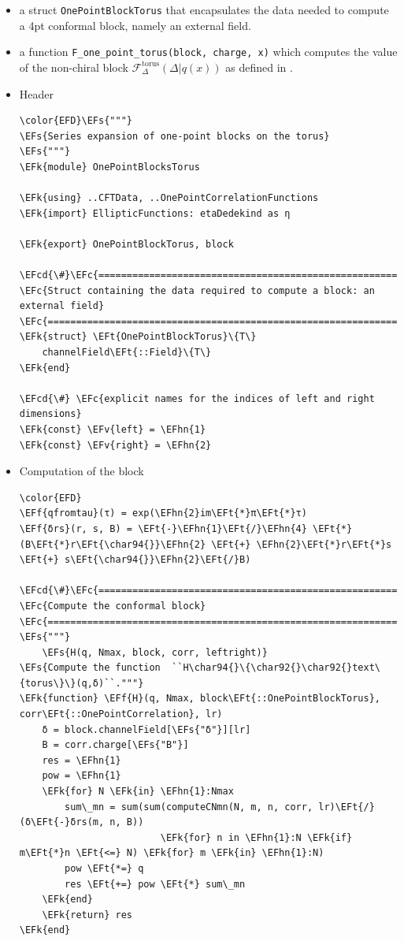 \documentclass[a4paper]{article}
\numberwithin{equation}{section}
\newcommand{\EFc}[1]{\textcolor{EFc}{#1}} %
\newcommand{\EFcd}[1]{\textcolor{EFcd}{#1}} %
\newcommand{\EFs}[1]{\textcolor{EFs}{#1}} %
\newcommand{\EFk}[1]{\textcolor{EFk}{#1}} %
\newcommand{\EFf}[1]{\textcolor{EFf}{#1}} %
\newcommand{\EFv}[1]{\textcolor{EFv}{#1}} %
\newcommand{\EFt}[1]{\textcolor{EFt}{#1}} %
\newcommand{\EFhn}[1]{\textcolor{EFhn}{#1}} %
\begin{document}
\begin{itemize}
\item a struct \texttt{OnePointBlockTorus} that encapsulates the data needed to compute a 4pt conformal block, namely an external field.
\item a function \texttt{F\_one\_point\_torus(block, charge, x)} which computes the value of the non-chiral block \(\mathcal F_{\Delta}^{\text{torus}}(\Delta | q(x))\) as defined in .
\end{itemize}
\begin{itemize}
\item Header
\label{sec:orgb3f3725}

\begin{Code}
\begin{Verbatim}
\color{EFD}\EFs{"""}
\EFs{Series expansion of one-point blocks on the torus}
\EFs{"""}
\EFk{module} OnePointBlocksTorus

\EFk{using} ..CFTData, ..OnePointCorrelationFunctions
\EFk{import} EllipticFunctions: etaDedekind as η

\EFk{export} OnePointBlockTorus, block

\EFcd{\#}\EFc{===========================================================================================}
\EFc{Struct containing the data required to compute a block: an external field}
\EFc{===========================================================================================\#}
\EFk{struct} \EFt{OnePointBlockTorus}\{T\}
    channelField\EFt{::Field}\{T\}
\EFk{end}

\EFcd{\#} \EFc{explicit names for the indices of left and right dimensions}
\EFk{const} \EFv{left} = \EFhn{1}
\EFk{const} \EFv{right} = \EFhn{2}
\end{Verbatim}
\end{Code}
\item Computation of the block
\label{sec:org62175fb}

\begin{Code}
\begin{Verbatim}
\color{EFD}
\EFf{qfromtau}(τ) = exp(\EFhn{2}im\EFt{*}π\EFt{*}τ)
\EFf{δrs}(r, s, B) = \EFt{-}\EFhn{1}\EFt{/}\EFhn{4} \EFt{*} (B\EFt{*}r\EFt{\char94{}}\EFhn{2} \EFt{+} \EFhn{2}\EFt{*}r\EFt{*}s \EFt{+} s\EFt{\char94{}}\EFhn{2}\EFt{/}B)

\EFcd{\#}\EFc{===========================================================================================}
\EFc{Compute the conformal block}
\EFc{===========================================================================================\#}
\EFs{"""}
    \EFs{H(q, Nmax, block, corr, leftright)}
\EFs{Compute the function  ``H\char94{}\{\char92{}\char92{}text\{torus\}\}(q,δ)``."""}
\EFk{function} \EFf{H}(q, Nmax, block\EFt{::OnePointBlockTorus}, corr\EFt{::OnePointCorrelation}, lr)
    δ = block.channelField[\EFs{"δ"}][lr]
    B = corr.charge[\EFs{"B"}]
    res = \EFhn{1}
    pow = \EFhn{1}
    \EFk{for} N \EFk{in} \EFhn{1}:Nmax
        sum\_mn = sum(sum(computeCNmn(N, m, n, corr, lr)\EFt{/}(δ\EFt{-}δrs(m, n, B))
                         \EFk{for} n in \EFhn{1}:N \EFk{if} m\EFt{*}n \EFt{<=} N) \EFk{for} m \EFk{in} \EFhn{1}:N)
        pow \EFt{*=} q
        res \EFt{+=} pow \EFt{*} sum\_mn
    \EFk{end}
    \EFk{return} res
\EFk{end}


\end{Verbatim}
\end{Code}
\end{itemize}
\end{document}
